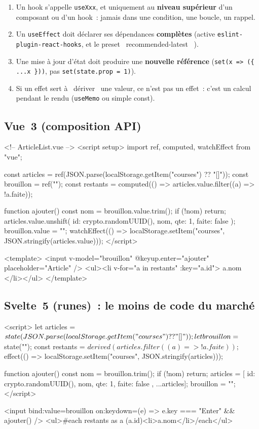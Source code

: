 \begin{enumerate}
  \item Un hook s'appelle \verb|useXxx|, et uniquement au \textbf{niveau sup\'erieur} d'un
        composant ou d'un hook~: jamais dans une condition, une boucle, un rappel.
  \item Un \verb|useEffect| doit d\'eclarer ses d\'ependances \textbf{compl\`etes}
        (active \verb|eslint-plugin-react-hooks|, et le preset \og ~recommended-latest~ \fg{}).
  \item Une mise \`a jour d'\'etat doit produire une \textbf{nouvelle r\'ef\'erence}
        (\verb!set(x => ({ ...x }))!, pas \verb!set(state.prop = 1)!).
  \item Si un effet sert \`a \og ~d\'eriver~ \fg{} une valeur, ce n'est pas un effet~: c'est un calcul
        pendant le rendu (\verb|useMemo| ou simple const).
\end{enumerate}

\subsection{Vue~3 (composition API)}

\begin{codeplain}
<!-- ArticleList.vue -->
<script setup>
import { ref, computed, watchEffect } from "vue";

const articles = ref(JSON.parse(localStorage.getItem("courses") ?? "[]"));
const brouillon = ref("");
const restants = computed(() => articles.value.filter((a) => !a.faite));

function ajouter() {
  const nom = brouillon.value.trim();
  if (!nom) return;
  articles.value.unshift({ id: crypto.randomUUID(), nom, qte: 1, faite: false });
  brouillon.value = "";
}
watchEffect(() => localStorage.setItem("courses", JSON.stringify(articles.value)));
</script>

<template>
  <input v-model="brouillon" @keyup.enter="ajouter" placeholder="Article" />
  <ul><li v-for="a in restants" :key="a.id">{{ a.nom }}</li></ul>
</template>
\end{codeplain}

\subsection{Svelte~5 (runes)~: le moins de code du march\'e}

\begin{codeplain}
<script>
  let articles = $state(JSON.parse(localStorage.getItem("courses") ?? "[]"));
  let brouillon = $state("");
  const restants = $derived(articles.filter((a) => !a.faite));
  $effect(() => localStorage.setItem("courses", JSON.stringify(articles)));

  function ajouter() {
    const nom = brouillon.trim();
    if (!nom) return;
    articles = [{ id: crypto.randomUUID(), nom, qte: 1, faite: false }, ...articles];
    brouillon = "";
  }
</script>

<input bind:value={brouillon} on:keydown={(e) => e.key === "Enter" && ajouter()} />
<ul>{#each restants as a (a.id)}<li>{a.nom}</li>{/each}</ul>
\end{codeplain}

